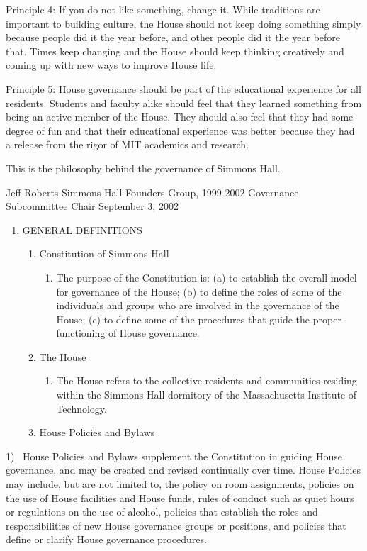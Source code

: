 \documentclass[letterpaper]{article}
\newcounter{saveenum}
\newcommand\liststyleWWNumv{%
\renewcommand\theenumi{\Roman{enumi}}
\renewcommand\theenumii{\arabic{enumii}}
\renewcommand\theenumiii{\arabic{enumiii}}
\renewcommand\theenumiv{\arabic{enumiv}}
\renewcommand\labelenumi{\theenumi.}
\renewcommand\labelenumii{\theenumii.}
\renewcommand\labelenumiii{\theenumiii)}
\renewcommand\labelenumiv{\theenumiv.}
}
\begin{document}
Principle 4: If you do not like something, change it. While traditions
are important to building culture, the House should not keep doing
something simply because people did it the year before, and other
people did it the year before that. Times keep changing and the House
should keep thinking creatively and coming up with new ways to improve
House life.

Principle 5: House governance should be part of the educational
experience for all residents. Students and faculty alike should feel
that they learned something from being an active member of the House.
They should also feel that they had some degree of fun and that their
educational experience was better because they had a release from the
rigor of MIT academics and research.

This is the philosophy behind the governance of Simmons Hall.

Jeff Roberts\newline
Simmons Hall Founders Group, 1999-2002\newline
Governance Subcommittee Chair\newline
September 3, 2002

\liststyleWWNumv
\setcounter{saveenum}{\value{enumi}}
\begin{enumerate}
\setcounter{enumi}{\value{saveenum}}
\item GENERAL DEFINITIONS 

\begin{enumerate}
\item Constitution of Simmons Hall 

\begin{enumerate}
\item The purpose of the Constitution is: (a) to establish the overall
model for governance of the House; (b) to define the roles of some of
the individuals and groups who are involved in the governance of the
House; (c) to define some of the procedures that guide the proper
functioning of House governance.
\end{enumerate}
\item The House 

\begin{enumerate}
\item The House refers to the collective residents and communities
residing within the Simmons Hall dormitory of the Massachusetts
Institute of Technology. 
\end{enumerate}
\item House Policies and Bylaws
\end{enumerate}
\end{enumerate}
1) \ House Policies and Bylaws supplement the Constitution in guiding
House governance, and may be created and revised continually over time.
House Policies may include, but are not limited to, the policy on room
assignments, policies on the use of House facilities and House funds,
rules of conduct such as quiet hours or regulations on the use of
alcohol, policies that establish the roles and responsibilities of new
House governance groups or positions, and policies that define or
clarify House governance procedures.
\end{document}
